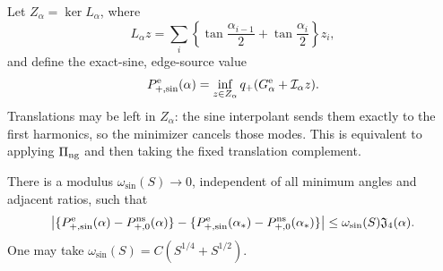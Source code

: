 Let $Z_\alpha=\ker L_\alpha$, where
\begin{equation}\label{JP:eq:normal-exact-area-row}
 L_\alpha z=\sum_i\left\{
 \tan\frac{\alpha_{i-1}}2+\tan\frac{\alpha_i}2\right\}z_i,
\end{equation}
and define the exact-sine, edge-source value
\begin{equation}\label{JP:eq:P-plus-normal-sine}
 P_{+,\sin}^{\rm e}(\alpha)
 =\inf_{z\in Z_\alpha}
 q_+(G_\alpha^{\rm e}+\mathcal I_\alpha z).
\end{equation}
Translations may be left in $Z_\alpha$: the sine interpolant sends them
exactly to the first harmonics, so the minimizer cancels those modes.  This
is equivalent to applying $\Pi_{\rm ng}$ and then taking the fixed
translation complement.

\begin{lemma}
\label{JP:lem:normal-sine-graph}
There is a modulus $\omega_{\sin}(S)\to0$, independent of all minimum
angles and adjacent ratios, such that
\begin{equation}\label{JP:eq:normal-sine-relative}
 \left|\{P_{+,\sin}^{\rm e}(\alpha)-P_{+,0}^{\rm ns}(\alpha)\}
 -\{P_{+,\sin}^{\rm e}(\alpha_*)-P_{+,0}^{\rm ns}(\alpha_*)\}\right|
 \le\omega_{\sin}(S)\mathfrak J_4(\alpha).
\end{equation}
One may take $\omega_{\sin}(S)=C(S^{1/4}+S^{1/2})$.
\end{lemma}

